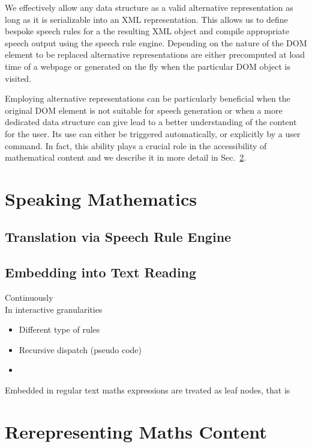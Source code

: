 \documentclass{sig-alternate}
\begin{document}
We effectively allow any data structure as a valid alternative representation as
long as it is serializable into an XML representation. This allows us to define
bespoke speech rules for a the resulting XML object and compile appropriate
speech output using the speech rule engine. Depending on the nature of the DOM
element to be replaced alternative representations are either precomputed at
load time of a webpage or generated on the fly when the particular DOM object is
visited.

Employing alternative representations can be particularly beneficial when the
original DOM element is not suitable for speech generation or when a more
dedicated data structure can give lead to a better understanding of the content
for the user. Its use can either be triggered automatically, or explicitly by a
user command. In fact, this ability plays a crucial role in the accessibility of
mathematical content and we describe it in more detail in
Sec.~\ref{sec:alternative}.


\section{Speaking Mathematics}
\label{sec:translate}

\subsection{Translation via Speech Rule Engine}

\subsection{Embedding into Text Reading}
\begin{description}
\item[Continuously] 
\item[In interactive granularities] 
\end{description}

\begin{itemize}
\item Different type of rules
\item Recursive dispatch (pseudo code)
\item 
\end{itemize}
Embedded in regular text maths expressions are treated as leaf nodes, that is

\section{Rerepresenting Maths Content}
\label{sec:alternative}
\end{document}
